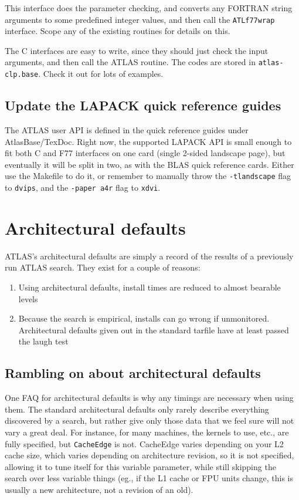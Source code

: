 \documentclass[11pt]{article}
\begin{document}
This interface does the
parameter checking, and converts any FORTRAN string arguments to some
predefined integer values, and then call the {\tt ATLf77wrap}
interface.  Scope any of the existing routines for details on this.

The C interfaces are easy to write, since they should just check the
input arguments, and then call the ATLAS routine. The codes are stored
in {\tt atlas-clp.base}. Check it out for lots of examples.

\subsection{Update the LAPACK quick reference guides}
The ATLAS user API is defined in the quick reference guides under
{AtlasBase/TexDoc}.  Right now, the supported LAPACK API is small enough to
fit both C and F77 interfaces on one card (single 2-sided landscape page),
but eventually it will be split in two, as with the BLAS quick reference
cards.  Either use the Makefile to do it, or remember to manually throw
the {\tt -tlandscape} flag to {\tt dvips}, and the {\tt -paper a4r} flag
to {\tt xdvi}.

\section{Architectural defaults}
ATLAS's architectural defaults are simply a record of the results of 
a previously run ATLAS search.  They exist for a couple of reasons:
\begin{enumerate}
\item Using architectural defaults, install times are reduced to almost
   bearable levels
\item Because the search is empirical, installs can go wrong if unmonitored.
   Architectural defaults given out in the standard tarfile have at least
   passed the laugh test
\end{enumerate}

\subsection{Rambling on about architectural defaults}
One FAQ for architectural defaults is why any timings are necessary when
using them.  The standard architectural defaults only rarely describe
everything discovered by a search, but rather give only those data
that we feel sure will not vary a great deal.  For instance, for many
machines, the kernels to use, etc., are fully specified, but {\tt CacheEdge}
is not.  CacheEdge varies depending on your L2 cache size, which varies
depending on architecture revision, so it is not specified, allowing it to
tune itself for this variable parameter, while still skipping the search over
less variable things (eg., if the L1 cache or FPU units change, this is
usually a new architecture, not a revision of an old).
\end{document}
